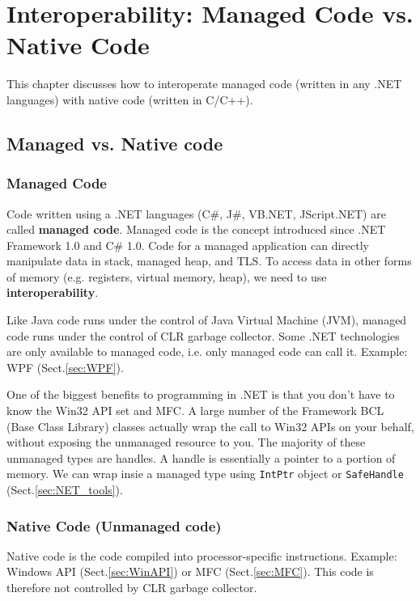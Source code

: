 \chapter{Interoperability: Managed Code vs. Native Code}
\label{chap:managed-code_native-code}

This chapter discusses how to interoperate managed code (written in any .NET languages)
with native code (written in C/C++). 

\section{Managed vs. Native code}

\subsection{Managed Code}
\label{sec:managed_code}

Code written using a .NET languages (C\#, J\#, VB.NET, JScript.NET) are called
{\bf managed code}. Managed code is the concept introduced since .NET Framework
1.0 and C\# 1.0.
Code for a managed application can directly manipulate data in stack, managed
heap, and TLS. To access data in other forms of memory (e.g. registers, virtual
memory, heap), we need to use {\bf interoperability}.

Like Java code runs under the control of Java Virtual Machine (JVM), managed
code runs under the control of CLR garbage collector. Some .NET technologies are
only available to managed code, i.e. only managed code can call it. Example: WPF
(Sect.\ref{sec:WPF}).

One of the biggest benefits to programming in .NET is that you don't have to
know the Win32 API set and MFC. A large number of the Framework BCL (Base Class
Library) classes actually wrap the call to Win32 APIs on your behalf,  without
exposing the unmanaged resource to you. The majority of these unmanaged types
are handles. A handle is essentially a pointer to a portion of memory. We can
wrap insie a managed type using \verb!IntPtr! object or \verb!SafeHandle!
(Sect.\ref{sec:NET_tools}).


\subsection{Native Code (Unmanaged code)}
\label{sec:unmanaged_code}

Native code is the code compiled into processor-specific instructions.
Example: Windows API (Sect.\ref{sec:WinAPI}) or MFC (Sect.\ref{sec:MFC}). This
code is therefore not controlled by CLR garbage collector.


